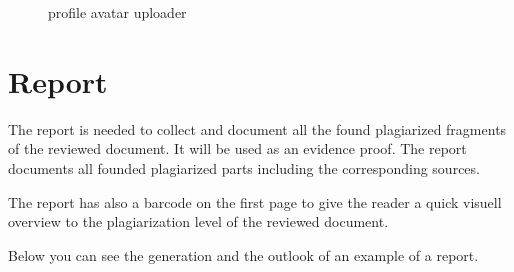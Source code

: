 \begin{figure}[!h]
  \centering
  \caption{profile avatar uploader}
  \label{fig:profil_editieren_uploader}
\end{figure}










\section{Report}

The report is needed to collect and document all the found plagiarized fragments of the reviewed document. It will be used as an evidence proof.
The report documents all founded plagiarized parts including the corresponding sources.

The report has also a barcode on the first page to give the reader a quick visuell overview to the plagiarization level of the reviewed document.

Below you can see the generation and the outlook of an example of a report.

